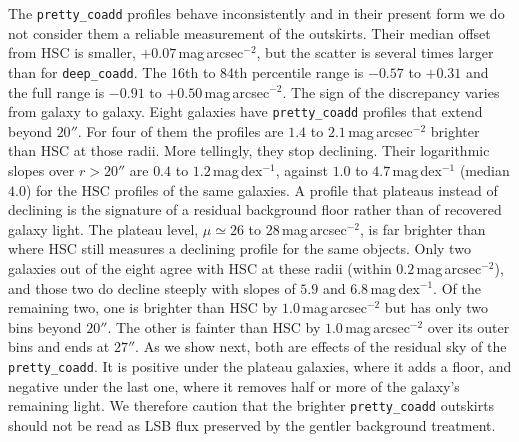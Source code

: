\documentclass[SE,lsstdraft,authoryear,toc]{lsstdoc}
\begin{document}
The \texttt{pretty\_coadd} profiles behave inconsistently and in their present form we do not consider them a reliable measurement of the outskirts. Their median offset from HSC is smaller, $+0.07$\,mag\,arcsec$^{-2}$, but the scatter is several times larger than for \texttt{deep\_coadd}. The 16th to 84th percentile range is $-0.57$ to $+0.31$ and the full range is $-0.91$ to $+0.50$\,mag\,arcsec$^{-2}$. The sign of the discrepancy varies from galaxy to galaxy. Eight galaxies have \texttt{pretty\_coadd} profiles that extend beyond $20''$. For four of them the profiles are $1.4$ to $2.1$\,mag\,arcsec$^{-2}$ brighter than HSC at those radii. More tellingly, they stop declining. Their logarithmic slopes over $r > 20''$ are $0.4$ to $1.2$\,mag\,dex$^{-1}$, against $1.0$ to $4.7$\,mag\,dex$^{-1}$ (median $4.0$) for the HSC profiles of the same galaxies. A profile that plateaus instead of declining is the signature of a residual background floor rather than of recovered galaxy light. The plateau level, $\mu \simeq 26$ to $28$\,mag\,arcsec$^{-2}$, is far brighter than where HSC still measures a declining profile for the same objects. Only two galaxies out of the eight agree with HSC at these radii (within $0.2$\,mag\,arcsec$^{-2}$), and those two do decline steeply with slopes of $5.9$ and $6.8$\,mag\,dex$^{-1}$. Of the remaining two, one is brighter than HSC by $1.0$\,mag\,arcsec$^{-2}$ but has only two bins beyond $20''$. The other is fainter than HSC by $1.0$\,mag\,arcsec$^{-2}$ over its outer bins and ends at $27''$. As we show next, both are effects of the residual sky of the \texttt{pretty\_coadd}. It is positive under the plateau galaxies, where it adds a floor, and negative under the last one, where it removes half or more of the galaxy's remaining light. We therefore caution that the brighter \texttt{pretty\_coadd} outskirts should not be read as LSB flux preserved by the gentler background treatment.
\end{document}
